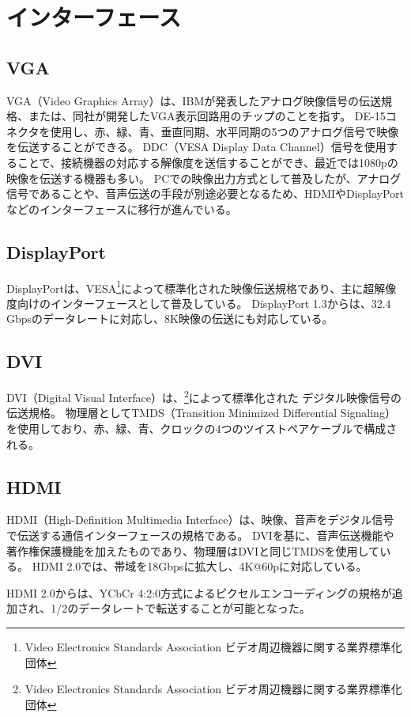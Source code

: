 \section{インターフェース}
\label{sec:interface}

\subsection{VGA}
VGA（Video Graphics Array）は、IBMが発表したアナログ映像信号の伝送規格、または、同社が開発したVGA表示回路用のチップのことを指す。
DE-15コネクタを使用し、赤、緑、青、垂直同期、水平同期の5つのアナログ信号で映像を伝送することができる。
DDC（VESA Display Data Channel）信号を使用することで、接続機器の対応する解像度を送信することができ、最近では1080pの映像を伝送する機器も多い。
PCでの映像出力方式として普及したが、アナログ信号であることや、音声伝送の手段が別途必要となるため、HDMIやDisplayPortなどのインターフェースに移行が進んでいる。

\subsection{DisplayPort}
DisplayPortは、VESA\footnote{Video Electronics Standards Association ビデオ周辺機器に関する業界標準化団体}によって標準化された映像伝送規格であり、主に超解像度向けのインターフェースとして普及している。
DisplayPort 1.3からは、32.4 Gbpsのデータレートに対応し、8K映像の伝送にも対応している。

\subsection{DVI}
DVI（Digital Visual Interface）は、\footnote{Video Electronics Standards Association ビデオ周辺機器に関する業界標準化団体}によって標準化された デジタル映像信号の伝送規格。
物理層としてTMDS（Transition Minimized Differential Signaling）を使用しており、赤、緑、青、クロックの4つのツイストペアケーブルで構成される。

\subsection{HDMI}
HDMI（High-Definition Multimedia Interface）は、映像、音声をデジタル信号で伝送する通信インターフェースの規格である。
DVIを基に、音声伝送機能や著作権保護機能を加えたものであり、物理層はDVIと同じTMDSを使用している。
HDMI 2.0では、帯域を18Gbpsに拡大し、4K@60pに対応している。

HDMI 2.0からは、YCbCr 4:2:0方式によるピクセルエンコーディングの規格が追加され、1/2のデータレートで転送することが可能となった。

